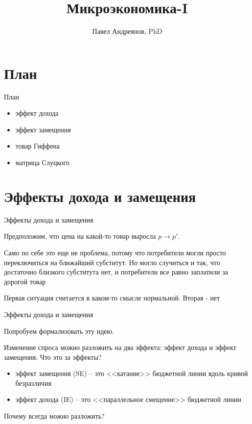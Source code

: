 \documentclass{beamer}
\title{
Микроэкономика-I
}
\author{
Павел Андреянов, PhD
}
\begin{document}
\maketitle

\section{План}

\begin{frame}{План}

\begin{itemize}
  \item эффект дохода
  \item эффект замещения
  \item товар Гиффена
  \item матрица Слуцкого
\end{itemize}


\end{frame}


\section{Эффекты дохода и замещения}

\begin{frame}{Эффекты дохода и замещения}

Предположим, что цена на какой-то товар выросла $p \to p'$. 

Само по себе это еще не проблема, потому что потребители могли просто переключиться на ближайший субститут. Но могло случиться и так, что достаточно близкого субститута нет, и потребители все равно заплатили за дорогой товар 

Первая ситуация считается в каком-то смысле нормальной. Вторая - нет
\end{frame}


\begin{frame}{Эффекты дохода и замещения}

Попробуем формализовать эту идею. 

Изменение спроса можно разложить на два эффекта: эффект дохода и эффект замещения. Что это за эффекты?

\begin{itemize}
\item \alert{эффект замещения} (SE) – это <<катание>> бюджетной линии вдоль кривой безразличия
\item \alert{эффект дохода} (IE) – это <<параллельное смещение>> бюджетной линии
\end{itemize}

Почему всегда можно разложить? 

\end{frame}
\end{document}

